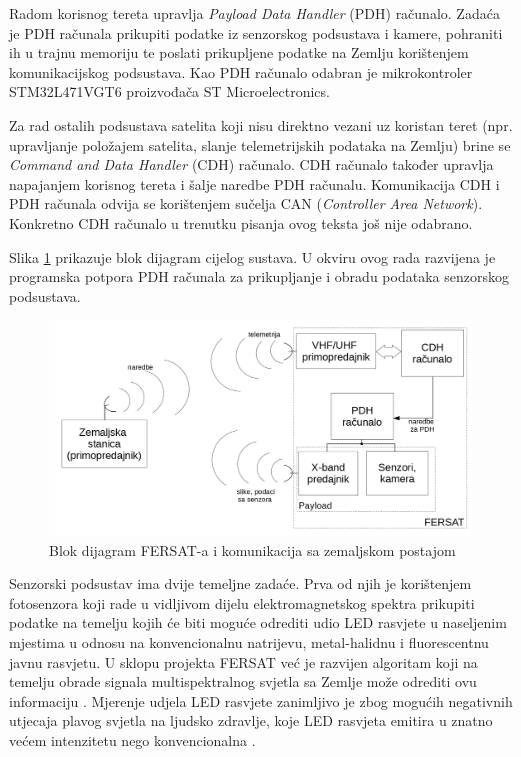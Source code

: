     Radom korisnog tereta upravlja \textit{Payload Data Handler} (PDH) računalo. Zadaća je PDH računala prikupiti podatke iz senzorskog podsustava i kamere, pohraniti ih u trajnu memoriju  te poslati prikupljene podatke na Zemlju korištenjem komunikacijskog podsustava. Kao PDH računalo odabran je mikrokontroler STM32L471VGT6 proizvođača ST Microelectronics.

    Za rad ostalih podsustava satelita koji nisu direktno vezani uz koristan teret (npr. upravljanje položajem satelita, slanje telemetrijskih podataka na Zemlju) brine se \textit{Command and Data Handler} (CDH) računalo. CDH računalo također upravlja napajanjem korisnog tereta i šalje naredbe PDH računalu. Komunikacija CDH i PDH računala odvija se korištenjem sučelja CAN (\textit{Controller Area Network}). Konkretno CDH računalo u trenutku pisanja ovog teksta još nije odabrano.

    Slika \ref{fig:fersat_blok} prikazuje blok dijagram cijelog sustava. U okviru ovog rada razvijena je programska potpora PDH računala za prikupljanje i obradu podataka senzorskog podsustava.
    
    \begin{figure}[htb]
        \centering
        \includegraphics[width=\textwidth]{slike/fersat_blok_dijagram.png}
        \caption{Blok dijagram FERSAT-a i komunikacija sa zemaljskom postajom \cite{diplomski_goran_petrak}}
        \label{fig:fersat_blok}
    \end{figure}

    Senzorski podsustav ima dvije temeljne zadaće. Prva od njih je korištenjem fotosenzora koji rade u vidljivom dijelu elektromagnetskog spektra prikupiti podatke na temelju kojih će biti moguće odrediti udio LED rasvjete u naseljenim mjestima u odnosu na konvencionalnu natrijevu, metal-halidnu i fluorescentnu javnu rasvjetu. U sklopu projekta FERSAT već je razvijen algoritam koji na temelju obrade signala multispektralnog svjetla sa Zemlje može odrediti ovu informaciju \cite{diplomski_jakov_tutavac}. Mjerenje udjela LED rasvjete zanimljivo je zbog mogućih negativnih utjecaja plavog svjetla na ljudsko zdravlje, koje LED rasvjeta emitira u znatno većem intenzitetu nego konvencionalna \cite{falchi_light_pollution}.

